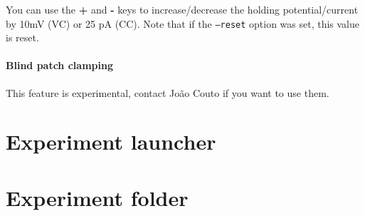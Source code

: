 You can use the \textbf{+} and \textbf{-} keys to increase/decrease the holding potential/current by 
10mV (VC) or 25 pA (CC). Note that if the \texttt{--reset} option was set, this value is reset.

\paragraph{Blind patch clamping} This feature is experimental, contact Jo\~ao Couto if you want to use them.


\section{Experiment launcher}

\section{Experiment folder} \label{sec:exp_folder}

